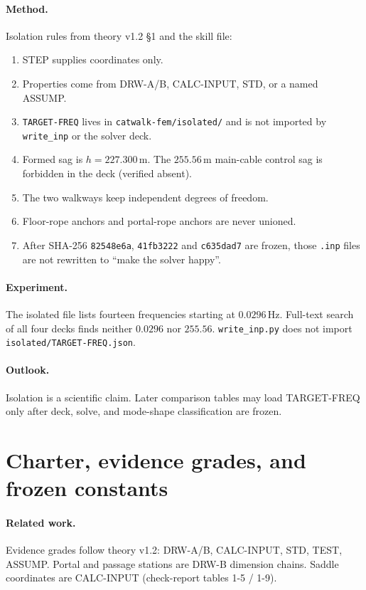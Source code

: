 \documentclass[11pt,a4paper]{article}
\begin{document}
\paragraph{Method.}
Isolation rules from theory v1.2 \S1 and the skill file:
\begin{enumerate}
\item STEP supplies coordinates only.
\item Properties come from DRW-A/B, CALC-INPUT, STD, or a named ASSUMP.
\item \texttt{TARGET-FREQ} lives in \texttt{catwalk-fem/isolated/} and is not
imported by \texttt{write\_inp} or the solver deck.
\item Formed sag is \(h=227.300\)\,m. The \(255.56\)\,m main-cable control sag
is forbidden in the deck (verified absent).
\item The two walkways keep independent degrees of freedom.
\item Floor-rope anchors and portal-rope anchors are never unioned.
\item After SHA-256 \texttt{82548e6a}, \texttt{41fb3222} and
\texttt{c635dad7} are frozen, those \texttt{.inp} files are not rewritten
to ``make the solver happy''.
\end{enumerate}

\paragraph{Experiment.}
The isolated file lists fourteen frequencies starting at \(0.0296\)\,Hz.
Full-text search of all four decks finds neither \(0.0296\) nor \(255.56\).
\texttt{write\_inp.py} does not import \texttt{isolated/TARGET-FREQ.json}.

\paragraph{Outlook.}
Isolation is a scientific claim. Later comparison tables may load TARGET-FREQ
only after deck, solve, and mode-shape classification are frozen.

\section{Charter, evidence grades, and frozen constants}
\label{sec:charter}

\paragraph{Related work.}
Evidence grades follow theory v1.2: DRW-A/B, CALC-INPUT, STD, TEST, ASSUMP.
Portal and passage stations are DRW-B dimension chains. Saddle coordinates are
CALC-INPUT (check-report tables 1-5 / 1-9).
\end{document}
